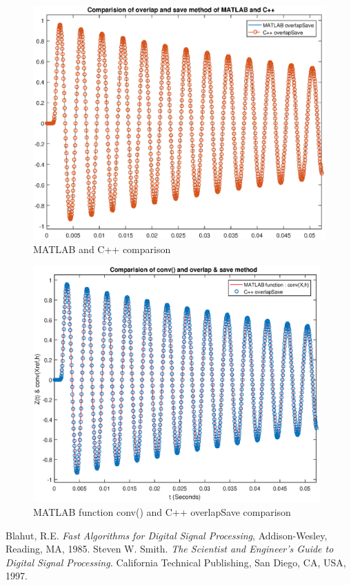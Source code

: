 \begin{figure}[h]
	\centering
	\includegraphics[width=12cm]{./algorithms/overlap_save/figures/sinusoid_with_exponent_matlab_and_C++.eps}
	\caption{MATLAB and C++ comparison}\label{sinusoid_with_exponent_matlab_and_C++}
\end{figure}

\begin{figure}[h]
	\centering
	\includegraphics[width=11cm]{./algorithms/overlap_save/figures/sinusoid_with_exponent_conv_and_C++.eps}
	\caption{MATLAB function conv() and C++ overlapSave comparison}\label{sinusoid_with_exponent_conv_and_C++}
\end{figure}

 \begin{thebibliography}{1}
   Blahut, R.E. {\em Fast Algorithms for Digital Signal Processing}, Addison-Wesley, Reading, MA,
1985.
   Steven W. Smith. {\em The Scientist and Engineer's Guide to Digital Signal Processing.} California Technical Publishing, San Diego, CA, USA, 1997.

  \end{thebibliography}

%

